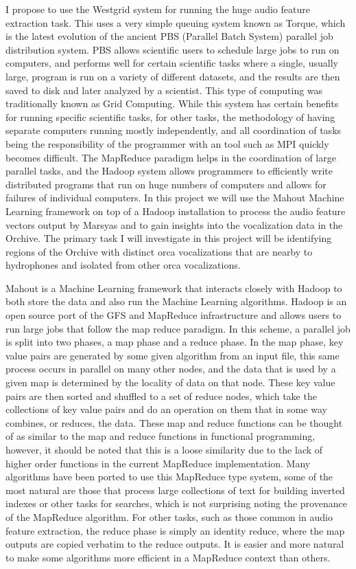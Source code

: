 \documentclass[12pt,oneside]{book}
\begin{document}
I propose to use the Westgrid system for running the huge audio
feature extraction task. This uses a very simple queuing system known
as Torque, which is the latest evolution of the ancient PBS (Parallel
Batch System) parallel job distribution system. PBS allows scientific
users to schedule large jobs to run on computers, and performs well
for certain scientific tasks where a single, usually large, program is
run on a variety of different datasets, and the results are then saved
to disk and later analyzed by a scientist. This type of computing was
traditionally known as Grid Computing.  While this system has certain
benefits for running specific scientific tasks, for other tasks, the
methodology of having separate computers running mostly independently,
and all coordination of tasks being the responsibility of the
programmer with an tool such as MPI quickly becomes difficult. The
MapReduce paradigm helps in the coordination of large parallel tasks,
and the Hadoop system allows programmers to efficiently write
distributed programs that run on huge numbers of computers and allows
for failures of individual computers. In this project we will use the
Mahout Machine Learning framework on top of a Hadoop installation to
process the audio feature vectors output by Marsyas and to gain
insights into the vocalization data in the Orchive. The primary task I
will investigate in this project will be identifying regions of the
Orchive with distinct orca vocalizations that are nearby to
hydrophones and isolated from other orca vocalizations.

Mahout is a Machine Learning framework that interacts closely with
Hadoop to both store the data and also run the Machine Learning
algorithms.  Hadoop is an open source port of the GFS
\cite{ghemawat03} and MapReduce \cite{dean08} infrastructure and
allows users to run large jobs that follow the map reduce paradigm.
In this scheme, a parallel job is split into two phases, a map phase
and a reduce phase.  In the map phase, key value pairs are generated
by some given algorithm from an input file, this same process occurs
in parallel on many other nodes, and the data that is used by a given
map is determined by the locality of data on that node.  These key
value pairs are then sorted and shuffled to a set of reduce nodes,
which take the collections of key value pairs and do an operation on
them that in some way combines, or reduces, the data.  These map and
reduce functions can be thought of as similar to the map and reduce
functions in functional programming, however, it should be noted that
this is a loose similarity due to the lack of higher order functions
in the current MapReduce implementation.  Many algorithms have been
ported to use this MapReduce type system, some of the most natural are
those that process large collections of text for building inverted
indexes or other tasks for searches, which is not surprising noting
the provenance of the MapReduce algorithm.  For other tasks, such as
those common in audio feature extraction, the reduce phase is simply
an identity reduce, where the map outputs are copied verbatim to the
reduce outputs.  It is easier and more natural to make some algorithms
more efficient in a MapReduce context than others.
\end{document}
